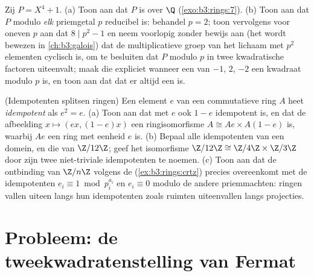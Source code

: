 \begin{exercise}[$\star\star\star$]\label{exo:b3:rings:11}
Zij $P = X^4 + 1$.
(a) Toon aan dat $P$  is over $\Q$
(\cref{exo:b3:rings:7}).
(b) Toon aan dat $P$ modulo \emph{elk} priemgetal $p$ reducibel is:
behandel $p = 2$; toon vervolgens voor oneven $p$ aan dat $8 \mid
p^2 - 1$ en neem voorlopig zonder bewijs aan (het wordt bewezen in
\cref{ch:b3:galois}) dat de multiplicatieve groep van het lichaam
met $p^2$ elementen cyclisch is, om te besluiten dat $P$ modulo $p$
in twee kwadratische factoren uiteenvalt; maak die expliciet
wanneer een van $-1$, $2$, $-2$ een kwadraat modulo $p$ is, en toon
aan dat dat er altijd een is.
\end{exercise}

\begin{exercise}[$\star\star$]\label{exo:b3:rings:12}
(Idempotenten splitsen ringen) Een element $e$ van een
commutatieve ring $A$ heet \emph{idempotent} als $e^2 = e$.
(a) Toon aan dat met $e$ ook $1 - e$ idempotent is, en dat de
afbeelding $x \mapsto (ex, (1-e)x)$ een ringisomorfisme $A
\cong Ae \times A(1-e)$ is, waarbij $Ae$ een ring met eenheid $e$
is.
(b) Bepaal alle idempotenten van een domein, en die van
$\Z/12\Z$; geef het isomorfisme $\Z/12\Z \cong \Z/4\Z \times
\Z/3\Z$ door zijn twee niet-triviale idempotenten te noemen.
(c) Toon aan dat de ontbinding van $\Z/n\Z$ volgens de  (\cref{ex:b3:rings:crtz}) precies overeenkomt met
de idempotenten $e_i \equiv 1 \bmod p_i^{a_i}$ en $e_i \equiv 0$
modulo de andere priemmachten: ringen vallen uiteen langs hun
idempotenten zoals ruimten uiteenvallen langs projecties.
\end{exercise}

\section{Probleem: de tweekwadratenstelling van Fermat}

